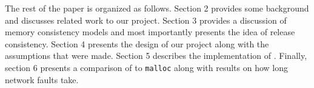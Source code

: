 \documentclass[10pt,conference]{IEEEtran}
\begin{document}
The rest of the paper is organized as follows.  Section 2 provides some background and discusses related work to our project.  Section 3 provides a discussion of memory consistency models and most importantly presents the idea of release consistency.  Section 4 presents the design of our project along with the assumptions that were made.  Section 5 describes the implementation of \projname{}.  Finally, section 6 presents a comparison of \projname{} to \verb,malloc, along with results on how long network faults take.









\end{document}
